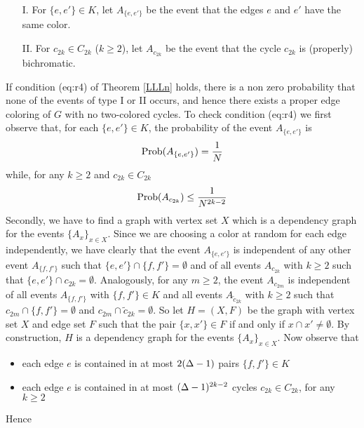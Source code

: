 \documentclass[11pt]{article}
\begin{document}
\begin{itemize}
\item[I.] For $\{e,e'\}\in K\mathbb{}$, let $A_{\{e,e'\}}$ be the event that  the  edges $e$ and $e'$ have the same color.

\item[II.] For   $c_{2k}\in C_{2k}$ ($k\ge 2$), let $A_{c_{2k}}$ be the event that the cycle $c_{2k}$ is (properly) bichromatic.
\end{itemize}


If condition \equ(eq:r4) of Theorem \ref{LLLn} holds,  there is a non zero probability
that none of the events of type I or II occurs, and hence there exists a proper edge coloring  of $G$  with
no two-colored cycles. To check condition \equ(eq:r4) we first observe that, for each $\{e,e'\}\in K$,  the probability
of the event $A_{\{e,e'\}}$ is
$$
{\rm Prob}(A_{\{e,e'\}}) = {1\over  N}
$$
while, for any $k\ge 2$ and $c_{2k}\in C_{2k}$
$$
{\rm Prob}(A_{c_{2k}})\le {1\over  N^{2k-2}}
$$
Secondly, we have to find a graph with vertex set $X$ which is a dependency graph for the events
$\{A_{x}\}_{x\in X}$.
Since we are choosing a color at random for each edge independently, we have clearly that the event $A_{\{e,e'\}}$ is independent
of any other event $A_{\{f,f'\}}$
such that $\{e,e'\}\cap \{f,f'\}=\emptyset$ and  of all events  $A_{c_{2k}}$ with  $k\ge 2$ such that $\{e,e'\}\cap c_{2k}=\emptyset$.
Analogously, for any $m\ge 2$,
the event $A_{c_{2m}}$ is independent of all events  $A_{\{f,f'\}}$ with  $\{f, f'\}\in K$ and all events $A_{\tilde c_{2k}}$ with $k\ge 2$ such that
$c_{2m}\cap \{f,f'\}=\emptyset$ and $c_{2m}\cap \tilde c_{2k}=\emptyset$. So let $H=(X,F)$ be the
graph with vertex set $X$ and edge set $F$ such that
the pair $\{x,x'\}\in F$ if and only if  $x\cap x'\neq\emptyset$. By construction, $H$ is a dependency graph for
the  events $\{A_{x}\}_{x\in X}$. Now observe that
\begin{itemize}
\item
each edge $e$ is contained in at most $2(\Delta-1)$ pairs $\{f,f'\}\in K$
\item
each edge $e$ is contained in at most $(\Delta-1)^{2k-2} $ cycles  $c_{2k}\in C_{2k}$,
for any $k\ge2$
\end{itemize}

Hence
\end{document}
